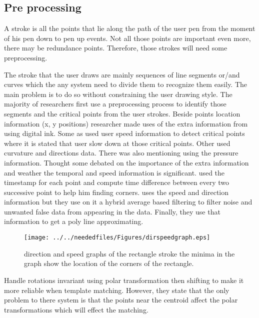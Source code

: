 \subsection{Pre processing }
\label {sec:preprocessing}
 A stroke is all the points that lie along the path of the user pen from the moment of his pen down to pen up events. Not all those points are important even more, there may be redundance points. Therefore, those strokes will need some preprocessing.
 
The stroke that the user draws are mainly sequences of line segments or/and curves which the any system need to divide them to recognize them easily. The main problem is to do so without constraining the user drawing style. The majority of researchers first use a preprocessing process to identify those segments and the critical points from the user strokes.  
Beside points location information (x, y positions) researcher made uses of the extra information from using digital ink. Some as \cite {mulitstroke5,polygonfeedback31}  used user speed information to detect critical points where it is stated that user slow down at those critical points. Other used curvature and directions data. There was also mentioning using the pressure information.  Thought some \cite {MilitaryCOA37,computationalmodel16,polygonfeedback31}  debated on the importance of the extra information and weather the temporal and speed information is significant.  \cite{polygonfeedback31}  used the timestamp for each point and compute time difference between every two successive point to help him finding corners.
\cite{Overview36} uses the speed and direction information but they use on it a hybrid average based filtering to filter noise and unwanted false data from appearing in the data. Finally, they use that information to get a poly line approximating.
 
 
\begin{figure}
	\centering
		\texttt{[image: ../../neededfiles/Figures/dirspeedgraph.eps]}
	\caption[Direction and Speed]{direction and speed graphs of the rectangle stroke the minima in the graph show the location of the corners of the rectangle.}
	\label{fig:dirspeedgraph}
\end{figure}

\cite{Mathpad46}Handle rotations invariant using polar transformation then shifting to make it more reliable when template matching. However, they state that the only problem to there system is that the points near the centroid affect the polar transformations which will effect the matching. %

